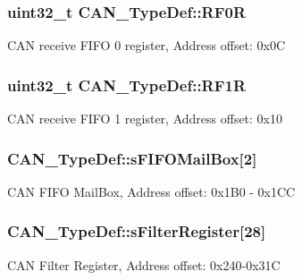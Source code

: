 \subsubsection[{\texorpdfstring{R\+F0R}{RF0R}}]{ uint32\+\_\+t C\+A\+N\+\_\+\+Type\+Def\+::\+R\+F0R}\hypertarget{struct_c_a_n___type_def_ad8e858479e26ab075ee2ddb630e8769d}{}\label{struct_c_a_n___type_def_ad8e858479e26ab075ee2ddb630e8769d}
C\+AN receive F\+I\+FO 0 register, Address offset\+: 0x0C 
\subsubsection[{\texorpdfstring{R\+F1R}{RF1R}}]{ uint32\+\_\+t C\+A\+N\+\_\+\+Type\+Def\+::\+R\+F1R}\hypertarget{struct_c_a_n___type_def_a69a528d1288c1de666df68655af1d20e}{}\label{struct_c_a_n___type_def_a69a528d1288c1de666df68655af1d20e}
C\+AN receive F\+I\+FO 1 register, Address offset\+: 0x10 
\subsubsection[{\texorpdfstring{s\+F\+I\+F\+O\+Mail\+Box}{sFIFOMailBox}}]{ C\+A\+N\+\_\+\+Type\+Def\+::s\+F\+I\+F\+O\+Mail\+Box\mbox{[}2\mbox{]}}\hypertarget{struct_c_a_n___type_def_aa6053bc607535d9ecf7a3d887c0cc053}{}\label{struct_c_a_n___type_def_aa6053bc607535d9ecf7a3d887c0cc053}
C\+AN F\+I\+FO Mail\+Box, Address offset\+: 0x1\+B0 -\/ 0x1\+CC 
\subsubsection[{\texorpdfstring{s\+Filter\+Register}{sFilterRegister}}]{ C\+A\+N\+\_\+\+Type\+Def\+::s\+Filter\+Register\mbox{[}28\mbox{]}}\hypertarget{struct_c_a_n___type_def_a23a22b903fdc909ac9f61edd68029f35}{}\label{struct_c_a_n___type_def_a23a22b903fdc909ac9f61edd68029f35}
C\+AN Filter Register, Address offset\+: 0x240-\/0x31C 
